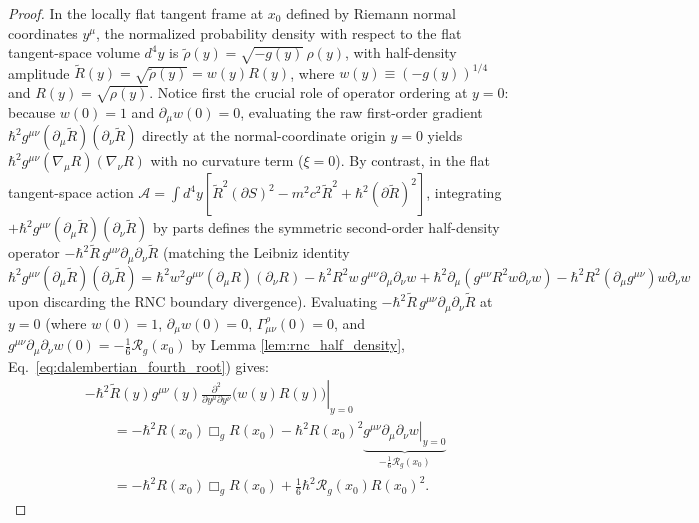 \documentclass[11pt, a4paper]{article}
\theoremstyle{definition}
\begin{document}
\begin{proof}
In the locally flat tangent frame at $x_0$ defined by Riemann normal coordinates $y^\mu$, the normalized probability density with respect to the flat tangent-space volume $d^4y$ is $\tilde{\rho}(y) = \sqrt{-g(y)}\,\rho(y)$, with half-density amplitude $\tilde{R}(y) = \sqrt{\tilde{\rho}(y)} = w(y) R(y)$, where $w(y) \equiv (-g(y))^{1/4}$ and $R(y) = \sqrt{\rho(y)}$. Notice first the crucial role of operator ordering at $y = 0$: because $w(0) = 1$ and $\partial_\mu w(0) = 0$, evaluating the raw first-order gradient $\hbar^2 g^{\mu\nu}(\partial_\mu \tilde{R})(\partial_\nu \tilde{R})$ directly at the normal-coordinate origin $y = 0$ yields $\hbar^2 g^{\mu\nu}(\nabla_\mu R)(\nabla_\nu R)$ with no curvature term ($\xi = 0$). By contrast, in the flat tangent-space action $\mathcal{A} = \int d^4y [\tilde{R}^2 (\partial S)^2 - m^2 c^2 \tilde{R}^2 + \hbar^2 (\partial \tilde{R})^2]$, integrating $+\hbar^2 g^{\mu\nu}(\partial_\mu \tilde{R})(\partial_\nu \tilde{R})$ by parts defines the symmetric second-order half-density operator $-\hbar^2 \tilde{R}\,g^{\mu\nu}\partial_\mu\partial_\nu \tilde{R}$ \cite{DeWitt1957} (matching the Leibniz identity $\hbar^2 g^{\mu\nu}(\partial_\mu \tilde{R})(\partial_\nu \tilde{R}) = \hbar^2 w^2 g^{\mu\nu}(\partial_\mu R)(\partial_\nu R) - \hbar^2 R^2 w\,g^{\mu\nu}\partial_\mu\partial_\nu w + \hbar^2 \partial_\mu(g^{\mu\nu}R^2 w\partial_\nu w) - \hbar^2 R^2(\partial_\mu g^{\mu\nu})w\partial_\nu w$ upon discarding the RNC boundary divergence). Evaluating $-\hbar^2 \tilde{R}\,g^{\mu\nu}\partial_\mu\partial_\nu \tilde{R}$ at $y = 0$ (where $w(0) = 1$, $\partial_\mu w(0) = 0$, $\Gamma^\rho_{\mu\nu}(0) = 0$, and $g^{\mu\nu}\partial_\mu\partial_\nu w(0) = -\frac{1}{6}\mathcal{R}_g(x_0)$ by Lemma \ref{lem:rnc_half_density}, Eq.~\eqref{eq:dalembertian_fourth_root}) gives:
\begin{equation}
\begin{aligned}
&\left. -\hbar^2 \tilde{R}(y) g^{\mu\nu}(y)\frac{\partial^2}{\partial y^\mu \partial y^\nu}\big(w(y) R(y)\big) \right|_{y=0} \\
&\qquad = -\hbar^2 R(x_0) \Box_g R(x_0) - \hbar^2 R(x_0)^2 \underbrace{\left. g^{\mu\nu}\partial_\mu\partial_\nu w \right|_{y=0}}_{-\frac{1}{6}\mathcal{R}_g(x_0)} \\
&\qquad = -\hbar^2 R(x_0)\Box_g R(x_0) + \frac{1}{6}\hbar^2 \mathcal{R}_g(x_0) R(x_0)^2.
\end{aligned}
\end{equation}

\end{proof}
\end{document}
